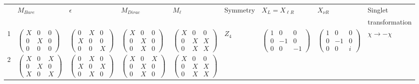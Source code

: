\documentclass[nofootinbib,showpacs]{revtex4}
\begin{document}
\begin{table}
\begin{center}
\begin{tabular}{|l|l|l|l|l|l|l|l|l|}
\hline
&$M_{Bare}$&$\epsilon$&$M_{Dirac}$&$M_\ell$&Symmetry&$X_L=X_{\ell R}$&$X_{\nu R}$&Singlet\\
&&&&&&&&transformation\\
\hline \hline
1&
$\left(\begin{array}{ccc}X&0&0\\0&X&0\\0&0&0\end{array}\right)$&
$\left(\begin{array}{ccc}0&X&0\\X&0&0\\0&0&X\end{array}\right)$&
$\left(\begin{array}{ccc}X&0&0\\0&X&0\\0&X&0\end{array}\right)$&
$\left(\begin{array}{ccc}X&0&0\\0&X&X\\0&X&X\end{array}\right)$&
$Z_4$&
$\left(\begin{array}{ccc}1&0&0\\0&-1&0\\0&0&-1\end{array}\right)$&
$\left(\begin{array}{ccc}1&0&0\\0&-1&0\\0&0&i\end{array}\right)$&
$\chi \rightarrow -\chi $
\\
\hline
2&
$\left(\begin{array}{ccc}X&0&X\\0&X&0\\X&0&X\end{array}\right)$&
$\left(\begin{array}{ccc}0&X&0\\X&0&X\\0&X&0\end{array}\right)$&
$\left(\begin{array}{ccc}X&0&X\\0&X&0\\0&X&0\end{array}\right)$&
$\left(\begin{array}{ccc}X&0&0\\0&X&X\\0&X&X\end{array}\right)$&

\end{tabular}
\end{center}
\end{table}
\end{document}
